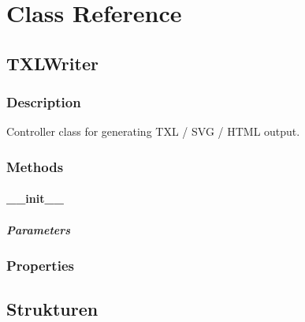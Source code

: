 \section{Class Reference}

    \subsection{TXLWriter}
        \subsubsection{Description}
            Controller class for generating TXL / SVG / HTML output.
        \subsubsection{Methods}
            \paragraph{__init__}
                \subparagraph{Parameters}
                    \begin{itemize}

                    \end{itemize}

        \subsubsection{Properties}

    \subsection{Strukturen}
